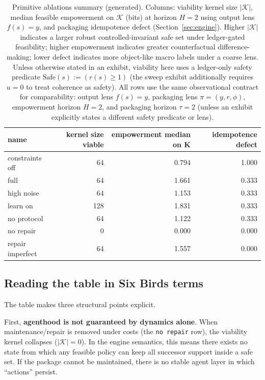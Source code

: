 \documentclass[11pt]{article}
\newcommand{\K}{\mathcal{K}}
\begin{document}
\begin{table}[t]
\centering
\small
\begin{tabular}{lrrr}
\toprule
name & kernel size viable & empowerment median on K & idempotence defect \\
\midrule
constraints off & 64 & 0.794 & 1.000 \\
full & 64 & 1.661 & 0.333 \\
high noise & 64 & 1.153 & 0.333 \\
learn on & 128 & 1.831 & 0.333 \\
no protocol & 64 & 1.122 & 0.333 \\
no repair & 0 & 0.000 & 0.000 \\
repair imperfect & 64 & 1.557 & 0.000 \\
\bottomrule
\end{tabular}
 \caption{Primitive ablations summary (generated). Columns: viability kernel size $|\K|$, median feasible empowerment on $\K$ (bits) at horizon $H=2$ using output lens $f(s)=y$, and packaging idempotence defect (Section~\ref{sec:engine}). Higher $|\K|$ indicates a larger robust controlled-invariant safe set under ledger-gated feasibility; higher empowerment indicates greater counterfactual difference-making; lower defect indicates more object-like macro labels under a coarse lens. Unless otherwise stated in an exhibit, viability here uses a ledger-only safety predicate $\mathrm{Safe}(s):=(r(s)\ge 1)$ (the sweep exhibit additionally requires $u=0$ to treat coherence as safety). All rows use the same observational contract for comparability: output lens $f(s)=y$, packaging lens $\pi=(y,r,\phi)$, empowerment horizon $H=2$, and packaging horizon $\tau=2$ (unless an exhibit explicitly states a different safety predicate or lens).}
\label{tab:ablations}
\end{table}

\subsection{Reading the table in Six Birds terms}
The table makes three structural points explicit.

First, \textbf{agenthood is not guaranteed by dynamics alone}. When maintenance/repair is removed under costs (the \texttt{no repair} row), the viability kernel collapses ($|\K|=0$). In the engine semantics, this means there exists no state from which any feasible policy can keep all successor support inside a safe set. If the package cannot be maintained, there is no stable agent layer in which ``actions'' persist.
\end{document}
